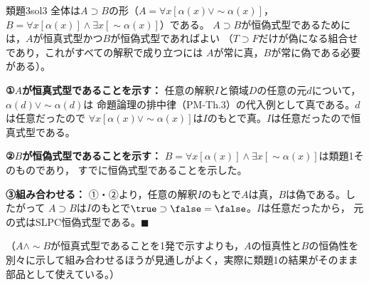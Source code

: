 \documentclass[autodetect-engine,dvi=dvipdfmx,ja=standard]{bxjsarticle}
\begin{document}
\begin{solution}{類題3}{sol3}
全体は\(A\supset B\)の形（\(A=\forall x[\alpha(x)\lor\sim\alpha(x)]\)，
\(B=\forall x[\alpha(x)]\land\exists x[\sim\alpha(x)]\)）である。
\(A\supset B\)が恒偽式型であるためには，\(A\)が恒真式型かつ\(B\)が恒偽式型であればよい
（\(T\supset F\)だけが偽になる組合せであり，これがすべての解釈で成り立つには
\(A\)が常に真，\(B\)が常に偽である必要がある）。

\textbf{①\(A\)が恒真式型であることを示す：}
任意の解釈\(I\)と領域\(D\)の任意の元\(d\)について，\(\alpha(d)\lor\sim\alpha(d)\)は
命題論理の排中律（PM-Th.3）の代入例として真である。\(d\)は任意だったので
\(\forall x[\alpha(x)\lor\sim\alpha(x)]\)は\(I\)のもとで真。\(I\)は任意だったので恒真式型である。

\textbf{②\(B\)が恒偽式型であることを示す：}
\(B=\forall x[\alpha(x)]\land\exists x[\sim\alpha(x)]\)は類題1そのものであり，
すでに恒偽式型であることを示した。

\textbf{③組み合わせる：}
①・②より，任意の解釈\(I\)のもとで\(A\)は真，\(B\)は偽である。したがって
\(A\supset B\)は\(I\)のもとで\(\true\supset\false=\false\)。\(I\)は任意だったから，
元の式はSLPC恒偽式型である。\hfill\(\blacksquare\)

（\(A\land\sim B\)が恒真式型であることを1発で示すよりも，\(A\)の恒真性と\(B\)の恒偽性を
別々に示して組み合わせるほうが見通しがよく，実際に類題1の結果がそのまま部品として使えている。）
\end{solution}
\end{document}
